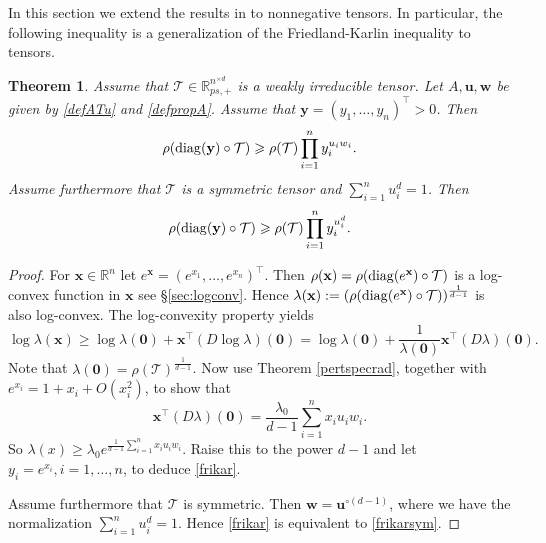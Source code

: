 \documentclass{amsart}
\newcommand{\differential}{D}
\newcommand{\diag}{\operatorname{diag}}
\newcommand{\R}{\mathbb{R}}
\newcommand{\uu}{\mathbf{u}}
\newcommand{\w}{\mathbf{w}}
\newcommand{\x}{\mathbf{x}}
\newcommand{\y}{\mathbf{y}}
\newcommand{\0}{\mathbf{0}}
\newcommand{\1}{\mathbf{1}}
\newcommand{\cT}{\mathcal{T}}
\def\diag{\mathop{{\rm diag}}\nolimits}
\newcommand{\trans}{^\top}
\newtheorem{theorem}[theo]{Theorem}
\theoremstyle{remark}
\numberwithin{equation}{section} %
\renewcommand{\ge}{\geqslant}
\begin{document}
In this section we extend the results in \cite[\S6.6]{Fribook} to nonnegative
tensors.  In particular, the following inequality is a generalization of the Friedland-Karlin \cite{FK75} inequality to tensors.
 \begin{theorem}\label{FKtens} Assume that $\cT\in \R_{ps,+}^{n^{\times d}}$ is a weakly irreducible tensor.
 Let $A,\uu,\w$ be given by \eqref{defATu} and \eqref{defpropA}.  Assume that
 $\y=(y_1,\ldots,y_n)\trans>0$.  Then
 \begin{equation}\label{frikar}
 \rho(\diag(\y)\circ \cT)\ge \rho(\cT)\prod_{i=1}^n y_i^{u_iw_i}.
 \end{equation}
%
Assume furthermore that $\cT$ is a symmetric tensor and {{$\sum_{i=1}^n u_i^d=1$}}. Then
 \begin{equation}\label{frikarsym}
 \rho(\diag(\y)\circ \cT)\ge \rho(\cT)\prod_{i=1}^n y_i^{u_i^d}.
 \end{equation}
  \end{theorem}
\begin{proof}
 For $\x\in\R^n$ let $e^{\x}=(e^{x_1},\ldots,e^{x_n})\trans$.
 Then $\rho(\x)=\rho(\diag(e^{\x})\circ \cT)$ is a log-convex function in $\x$ see \S\ref{sec:logconv}.
 Hence $\lambda(\x):=(\rho(\diag(e^{\x})\circ \cT))^{\frac{1}{d-1}}$ is also log-convex.
 The log-convexity property yields
 $$\log\lambda(\x)\ge \log\lambda(\0)+\x\trans (\differential\log\lambda)(\0)=\log\lambda(\0)+\frac{1}{\lambda(\0)}\x\trans(\differential\lambda)(\0).$$
 Note that $\lambda(\0)=\rho(\cT)^{\frac{1}{d-1}}$.  Now use Theorem \ref{pertspecrad}, together with $e^{x_i}=1+x_i + O(x_i^2)$,
 to show that
 $$\x\trans(\differential\lambda)(\0)=\frac{\lambda_0}{d-1}\sum_{i=1}^n x_iu_iw_i.$$
%
  So
 $\lambda(x)\ge \lambda_0 e^{\frac{1}{d-1}\sum_{i=1}^n x_iu_iw_i}$.  Raise this to the power $d-1$ and let $y_i=e^{x_i}, i=1,\ldots,n$, 
%
to deduce
 \eqref{frikar}.
 
%
 Assume furthermore that $\cT$ is symmetric.  Then $\w=\uu^{\circ (d-1)}$, where we have the normalization $\sum_{i=1}^n u_i^d=1$.
 Hence \eqref{frikar} is equivalent to \eqref{frikarsym}.
\end{proof}
 
%
%
%
%
 
\end{document}
